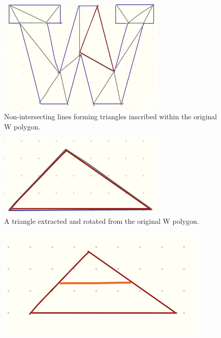 \documentclass{article}
\begin{document}
\begin{figure}[ht]
    \centering
    \includegraphics[width=8cm]{Capstone Presentation/Draft Diagrams/Section 2 Diagrams/3.3 Rough Diagrams 2.png}
    \caption{Non-intersecting lines forming triangles inscribed within the original W polygon.}
     \label{Fig_Rough_2}
\end{figure}

\begin{figure}[ht]
    \centering
    \includegraphics[width=8cm]{Capstone Presentation/Draft Diagrams/Section 2 Diagrams/3.3 Rough Diagrams 3.png}
    \caption{A triangle extracted and rotated from the original W polygon.}
     \label{Fig_Rough_3}
\end{figure}

\begin{figure}[ht]
    \centering
    \includegraphics[width=10cm]{Capstone Presentation/Draft Diagrams/Section 2 Diagrams/3.3 Rough Diagrams 4.png}
    
    \caption{}
    \label{Fig_Rough_4}
\end{figure}
\end{document}
